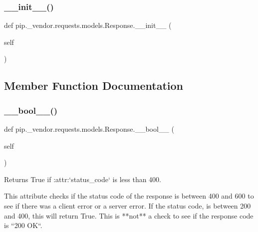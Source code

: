 \subsubsection{\texorpdfstring{\+\_\+\+\_\+init\+\_\+\+\_\+()}{\_\_init\_\_()}}
{\footnotesize\ttfamily def pip.\+\_\+vendor.\+requests.\+models.\+Response.\+\_\+\+\_\+init\+\_\+\+\_\+ (\begin{DoxyParamCaption}\item[{}]{self }\end{DoxyParamCaption})}



\subsection{Member Function Documentation}
\mbox{\label{classpip_1_1__vendor_1_1requests_1_1models_1_1Response_addecc3993b3505c3e7081c6195be4f4a}} 
\subsubsection{\texorpdfstring{\+\_\+\+\_\+bool\+\_\+\+\_\+()}{\_\_bool\_\_()}}
{\footnotesize\ttfamily def pip.\+\_\+vendor.\+requests.\+models.\+Response.\+\_\+\+\_\+bool\+\_\+\+\_\+ (\begin{DoxyParamCaption}\item[{}]{self }\end{DoxyParamCaption})}

\begin{DoxyVerb}Returns True if :attr:`status_code` is less than 400.

This attribute checks if the status code of the response is between
400 and 600 to see if there was a client error or a server error. If
the status code, is between 200 and 400, this will return True. This
is **not** a check to see if the response code is ``200 OK``.
\end{DoxyVerb}
 \mbox{\label{classpip_1_1__vendor_1_1requests_1_1models_1_1Response_af6d396f4db38edf1020b3804fada0396}} 
